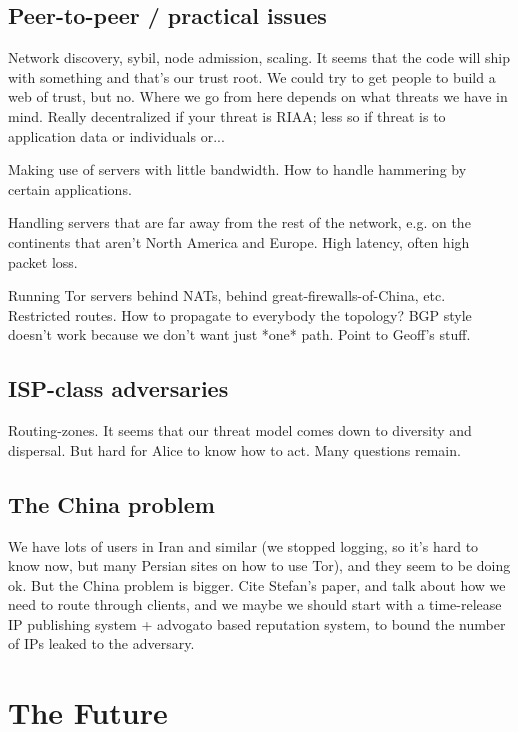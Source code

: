 \documentclass{llncs}
\begin{document}
\subsection{Peer-to-peer / practical issues}

Network discovery, sybil, node admission, scaling. It seems that the code
will ship with something and that's our trust root. We could try to get
people to build a web of trust, but no. Where we go from here depends
on what threats we have in mind. Really decentralized if your threat is
RIAA; less so if threat is to application data or individuals or...

Making use of servers with little bandwidth. How to handle hammering by
certain applications.

Handling servers that are far away from the rest of the network, e.g. on
the continents that aren't North America and Europe. High latency,
often high packet loss.

Running Tor servers behind NATs, behind great-firewalls-of-China, etc.
Restricted routes. How to propagate to everybody the topology? BGP
style doesn't work because we don't want just *one* path. Point to
Geoff's stuff.

\subsection{ISP-class adversaries}

Routing-zones. It seems that our threat model comes down to diversity and
dispersal. But hard for Alice to know how to act. Many questions remain.

\subsection{The China problem}

We have lots of users in Iran and similar (we stopped
logging, so it's hard to know now, but many Persian sites on how to use
Tor), and they seem to be doing ok. But the China problem is bigger. Cite
Stefan's paper, and talk about how we need to route through clients,
and we maybe we should start with a time-release IP publishing system +
advogato based reputation system, to bound the number of IPs leaked to the
adversary.

\section{The Future}
\label{sec:conclusion}


 
\end{document}

